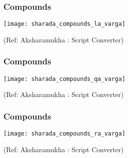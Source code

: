 \begin{frame}[fragile]\frametitle{Compounds}

	\begin{center}
	\texttt{[image: sharada\_compounds\_la\_varga]} 
	
	{\tiny (Ref: Aksharamukha : Script Converter)}
	\end{center}	

\end{frame}

\begin{frame}[fragile]\frametitle{Compounds}

	\begin{center}
	\texttt{[image: sharada\_compounds\_qa\_varga]} 
	
	{\tiny (Ref: Aksharamukha : Script Converter)}
	\end{center}	

\end{frame}

\begin{frame}[fragile]\frametitle{Compounds}

	\begin{center}
	\texttt{[image: sharada\_compounds\_ra\_varga]} 
	
	{\tiny (Ref: Aksharamukha : Script Converter)}
	\end{center}	

\end{frame}
